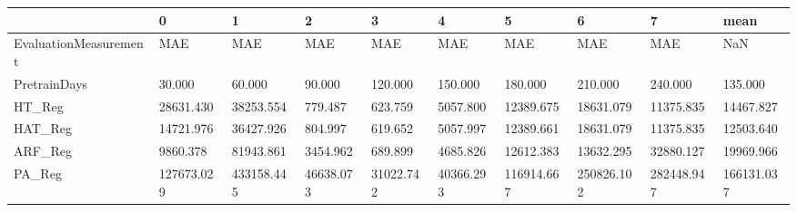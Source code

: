 \begin{tabular}{llllllllll}
\toprule
{} &          0 &          1 &         2 &         3 &         4 &          5 &          6 &          7 &       mean \\
\midrule
EvaluationMeasurement &        MAE &        MAE &       MAE &       MAE &       MAE &        MAE &        MAE &        MAE &        NaN \\
PretrainDays          &     30.000 &     60.000 &    90.000 &   120.000 &   150.000 &    180.000 &    210.000 &    240.000 &    135.000 \\
HT\_Reg                &  28631.430 &  38253.554 &   779.487 &   623.759 &  5057.800 &  12389.675 &  18631.079 &  11375.835 &  14467.827 \\
HAT\_Reg               &  14721.976 &  36427.926 &   804.997 &   619.652 &  5057.997 &  12389.661 &  18631.079 &  11375.835 &  12503.640 \\
ARF\_Reg               &   9860.378 &  81943.861 &  3454.962 &   689.899 &  4685.826 &  12612.383 &  13632.295 &  32880.127 &  19969.966 \\
PA\_Reg                & 127673.029 & 433158.445 & 46638.073 & 31022.742 & 40366.293 & 116914.667 & 250826.102 & 282448.947 & 166131.037 \\
\bottomrule
\end{tabular}
